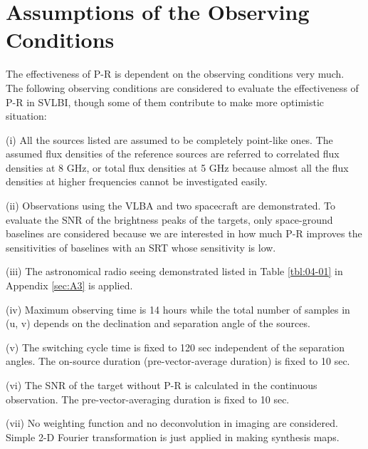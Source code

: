 \section{
  \label{sec:02}
  Assumptions of the Observing Conditions
}
The effectiveness of P-R is dependent on the observing conditions 
very much. The following observing conditions are considered to 
evaluate the effectiveness of P-R in SVLBI, though some of them 
contribute to make more optimistic situation: 
\begin{list}{}
{
    \setlength{\itemindent}{-6mm}
    \setlength{\parsep}{0mm}
    \setlength{\topsep}{3mm}
}
\item{(i)}
All the sources listed are assumed to be completely point-like ones. 
The assumed flux densities of the reference sources are 
referred to correlated flux densities at 8 GHz, or total flux 
densities at 5 GHz because almost all the flux densities at higher 
frequencies cannot be investigated easily. 
\item{(ii)}
Observations using the VLBA and two spacecraft are demonstrated. 
To evaluate the SNR of the brightness peaks of the targets, 
only space-ground baselines are considered because we are 
interested in how much P-R improves the sensitivities of baselines 
with an SRT whose sensitivity is low. 
\item{(iii)}
The astronomical radio seeing demonstrated listed in Table 
\ref{tbl:04-01} in Appendix \ref{sec:A3} is applied. 
\item{(iv)}
Maximum observing time is 14 hours while the total number of 
samples in (u, v) depends on the declination and separation 
angle of the sources. 
\item{(v)}
The switching cycle time is fixed to 120 sec independent of the 
separation angles. The on-source duration 
(pre-vector-average duration) is fixed to 10 sec. 
\item{(vi)}
The SNR of the target without P-R is calculated in the continuous 
observation. The pre-vector-averaging duration is fixed to 10 sec. 
\item{(vii)}
No weighting function and no deconvolution in imaging are 
considered. Simple 2-D Fourier transformation is just applied 
in making synthesis maps.
\end{list}

